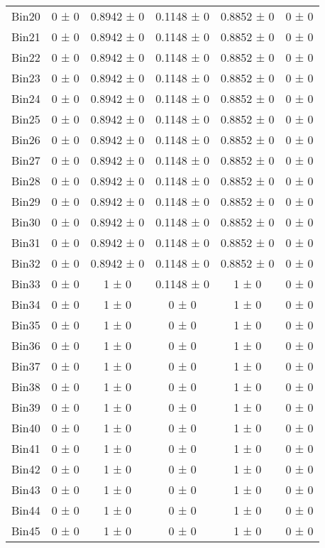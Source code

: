 \begin{tabular}{@{\extracolsep{4pt}}lccccc@{}}
     Bin20 & 0 ± 0 & 0.8942 ± 0 & 0.1148 ± 0 & 0.8852 ± 0 & 0 ± 0 \\ 
     Bin21 & 0 ± 0 & 0.8942 ± 0 & 0.1148 ± 0 & 0.8852 ± 0 & 0 ± 0 \\ 
     Bin22 & 0 ± 0 & 0.8942 ± 0 & 0.1148 ± 0 & 0.8852 ± 0 & 0 ± 0 \\ 
     Bin23 & 0 ± 0 & 0.8942 ± 0 & 0.1148 ± 0 & 0.8852 ± 0 & 0 ± 0 \\ 
     Bin24 & 0 ± 0 & 0.8942 ± 0 & 0.1148 ± 0 & 0.8852 ± 0 & 0 ± 0 \\ 
     Bin25 & 0 ± 0 & 0.8942 ± 0 & 0.1148 ± 0 & 0.8852 ± 0 & 0 ± 0 \\ 
     Bin26 & 0 ± 0 & 0.8942 ± 0 & 0.1148 ± 0 & 0.8852 ± 0 & 0 ± 0 \\ 
     Bin27 & 0 ± 0 & 0.8942 ± 0 & 0.1148 ± 0 & 0.8852 ± 0 & 0 ± 0 \\ 
     Bin28 & 0 ± 0 & 0.8942 ± 0 & 0.1148 ± 0 & 0.8852 ± 0 & 0 ± 0 \\ 
     Bin29 & 0 ± 0 & 0.8942 ± 0 & 0.1148 ± 0 & 0.8852 ± 0 & 0 ± 0 \\ 
     Bin30 & 0 ± 0 & 0.8942 ± 0 & 0.1148 ± 0 & 0.8852 ± 0 & 0 ± 0 \\ 
     Bin31 & 0 ± 0 & 0.8942 ± 0 & 0.1148 ± 0 & 0.8852 ± 0 & 0 ± 0 \\ 
     Bin32 & 0 ± 0 & 0.8942 ± 0 & 0.1148 ± 0 & 0.8852 ± 0 & 0 ± 0 \\ 
     Bin33 & 0 ± 0 & 1 ± 0 & 0.1148 ± 0 & 1 ± 0 & 0 ± 0 \\ 
     Bin34 & 0 ± 0 & 1 ± 0 & 0 ± 0 & 1 ± 0 & 0 ± 0 \\ 
     Bin35 & 0 ± 0 & 1 ± 0 & 0 ± 0 & 1 ± 0 & 0 ± 0 \\ 
     Bin36 & 0 ± 0 & 1 ± 0 & 0 ± 0 & 1 ± 0 & 0 ± 0 \\ 
     Bin37 & 0 ± 0 & 1 ± 0 & 0 ± 0 & 1 ± 0 & 0 ± 0 \\ 
     Bin38 & 0 ± 0 & 1 ± 0 & 0 ± 0 & 1 ± 0 & 0 ± 0 \\ 
     Bin39 & 0 ± 0 & 1 ± 0 & 0 ± 0 & 1 ± 0 & 0 ± 0 \\ 
     Bin40 & 0 ± 0 & 1 ± 0 & 0 ± 0 & 1 ± 0 & 0 ± 0 \\ 
     Bin41 & 0 ± 0 & 1 ± 0 & 0 ± 0 & 1 ± 0 & 0 ± 0 \\ 
     Bin42 & 0 ± 0 & 1 ± 0 & 0 ± 0 & 1 ± 0 & 0 ± 0 \\ 
     Bin43 & 0 ± 0 & 1 ± 0 & 0 ± 0 & 1 ± 0 & 0 ± 0 \\ 
     Bin44 & 0 ± 0 & 1 ± 0 & 0 ± 0 & 1 ± 0 & 0 ± 0 \\ 
     Bin45 & 0 ± 0 & 1 ± 0 & 0 ± 0 & 1 ± 0 & 0 ± 0 \\ 

\end{tabular}
